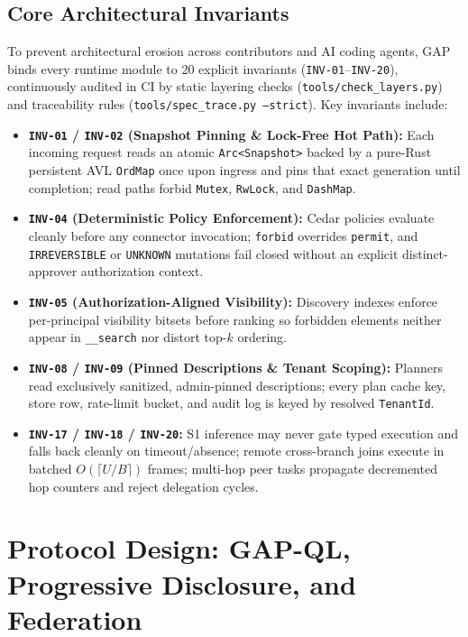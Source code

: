 \documentclass[10pt,twocolumn]{article}
\begin{document}
\subsection{Core Architectural Invariants}
To prevent architectural erosion across contributors and AI coding agents, GAP binds every runtime module to 20 explicit invariants (\texttt{INV-01}--\texttt{INV-20}), continuously audited in CI by static layering checks (\texttt{tools/check\_layers.py}) and traceability rules (\texttt{tools/spec\_trace.py --strict}). Key invariants include:
\begin{itemize}
  \item \textbf{\texttt{INV-01} / \texttt{INV-02} (Snapshot Pinning \& Lock-Free Hot Path):} Each incoming request reads an atomic \texttt{Arc<Snapshot>} backed by a pure-Rust persistent AVL \texttt{OrdMap} once upon ingress and pins that exact generation until completion; read paths forbid \texttt{Mutex}, \texttt{RwLock}, and \texttt{DashMap}.
  \item \textbf{\texttt{INV-04} (Deterministic Policy Enforcement):} Cedar policies evaluate cleanly before any connector invocation; \texttt{forbid} overrides \texttt{permit}, and \texttt{IRREVERSIBLE} or \texttt{UNKNOWN} mutations fail closed without an explicit distinct-approver authorization context.
  \item \textbf{\texttt{INV-05} (Authorization-Aligned Visibility):} Discovery indexes enforce per-principal visibility bitsets before ranking so forbidden elements neither appear in \texttt{\_\_search} nor distort top-$k$ ordering.
  \item \textbf{\texttt{INV-08} / \texttt{INV-09} (Pinned Descriptions \& Tenant Scoping):} Planners read exclusively sanitized, admin-pinned descriptions; every plan cache key, store row, rate-limit bucket, and audit log is keyed by resolved \texttt{TenantId}.
  \item \textbf{\texttt{INV-17} / \texttt{INV-18} / \texttt{INV-20}:} S1 inference may never gate typed execution and falls back cleanly on timeout/absence; remote cross-branch joins execute in batched $O(\lceil U/B\rceil)$ frames; multi-hop peer tasks propagate decremented hop counters and reject delegation cycles.
\end{itemize}

\section{Protocol Design: GAP-QL, Progressive Disclosure, and Federation}
\label{sec:proto}
\end{document}
